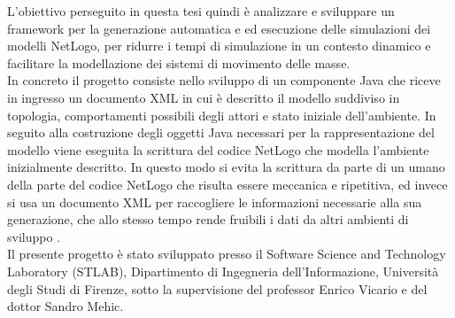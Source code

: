 L'obiettivo perseguito in questa tesi quindi è analizzare e sviluppare un framework per la generazione automatica e ed esecuzione delle simulazioni dei modelli NetLogo, per ridurre i tempi di simulazione in un contesto dinamico e facilitare la modellazione dei sistemi di movimento delle masse.\\
In concreto il progetto consiste nello sviluppo di un componente Java che riceve in ingresso un documento XML in cui è descritto il modello suddiviso in topologia, comportamenti possibili degli attori e stato iniziale dell'ambiente. In seguito alla costruzione degli oggetti Java necessari per la rappresentazione del modello viene eseguita la scrittura del codice NetLogo che modella l'ambiente inizialmente descritto. In questo modo si evita la scrittura da parte di un umano della parte del codice NetLogo che risulta essere meccanica e ripetitiva, ed invece si usa un documento XML per raccogliere le informazioni necessarie alla sua generazione, che allo stesso tempo rende fruibili i dati da altri ambienti di sviluppo .\\
Il presente progetto è stato sviluppato presso il Software Science and Technology Laboratory (STLAB), Dipartimento di Ingegneria dell'Informazione, Università degli Studi di Firenze, sotto la supervisione del professor Enrico Vicario e del dottor Sandro Mehic.\\
 